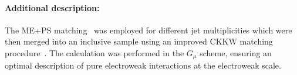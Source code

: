 \paragraph{Additional description:}

The ME+PS matching~\cite{Hoeche:2011fd} was employed for different jet
multiplicities which were then merged into an inclusive sample 
using an improved CKKW matching
procedure~\cite{Catani:2001cc,Hoeche:2009rj}.  The calculation was
performed in the $G_\mu$ scheme, ensuring an optimal description
of pure electroweak interactions at the electroweak scale.


